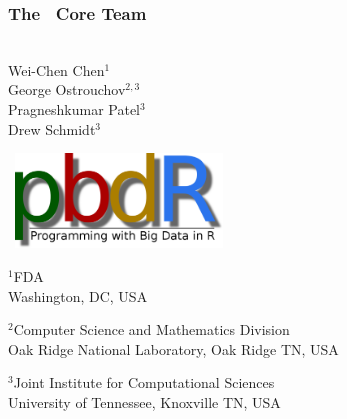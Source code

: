 \frame{  \maketitle   }

\setcounter{footnote}{0}

\begin{frame}[noframenumbering]
\frametitle{The \pbdR\ Core Team}
\begin{minipage}{1\textwidth}
  \vspace{-.6cm}
\begin{minipage}{3.6cm}
\ \\[.8cm]
Wei-Chen Chen$^1$ \\
George Ostrouchov$^{2,3}$ \\
Pragneshkumar Patel$^3$ \\
Drew Schmidt$^3$\\[2ex]
\end{minipage}
\begin{minipage}{7cm}
  \ \hfill \includegraphics[width=5.5cm]{../common/pics/logos/newpbdr}
\end{minipage}
\end{minipage}
  \begin{minipage}{2.2cm}\tiny
    $^1$FDA\\
    Washington, DC, USA
  \end{minipage}
  \hspace{1ex}
  \begin{minipage}{5cm}\tiny
    $^2$Computer Science and Mathematics Division\\
    Oak Ridge National Laboratory, Oak Ridge TN, USA
  \end{minipage}
  \hspace{1ex}
  \begin{minipage}{4cm}\tiny
    $^3$Joint Institute for Computational Sciences\\
    University of Tennessee, Knoxville TN, USA
  \end{minipage}


\end{frame}
